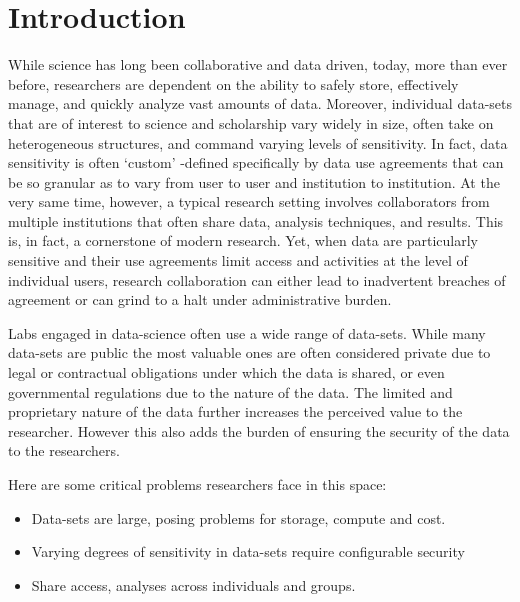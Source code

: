 \section{Introduction}



While science has long been collaborative and data driven, today, more than ever before, researchers are dependent on the ability to safely store, effectively manage, and quickly analyze vast amounts of
data. Moreover, individual data-sets that are of interest to science and scholarship vary widely in size, often take on heterogeneous structures, and command varying levels of sensitivity. In fact, data sensitivity is often `custom' -defined specifically by
data use agreements that can be so granular as to vary from user to user and institution to institution. At the very same time, however, a typical research setting involves collaborators from multiple institutions that often share data, analysis techniques, and results. This is, in fact, a cornerstone of modern research. Yet, when data are particularly sensitive and their use agreements limit access and activities at the level of individual users, research collaboration can either lead to inadvertent breaches of agreement or can grind to a halt under administrative burden.



Labs engaged in data-science often use a wide range of data-sets. While many data-sets are public the most
valuable ones are often considered private due to legal or contractual obligations under which the data
is shared, or even governmental regulations due to the nature of the data. The limited and proprietary nature
of the data further increases the perceived value to the researcher. However this also adds the burden of
ensuring the security of the data to the researchers.


Here are some critical problems researchers face in this space:

\begin{itemize}
\item Data-sets are large, posing problems for storage, compute and cost.
\item Varying degrees of sensitivity in data-sets require configurable security
\item Share access, analyses across individuals and groups.
\end{itemize}





